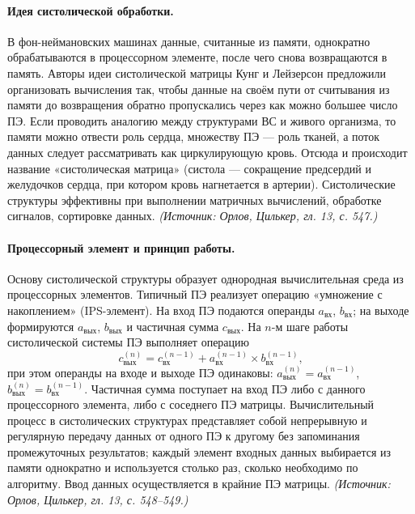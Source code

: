 \documentclass[a4paper,12pt]{article}
\begin{document}
\paragraph{Идея систолической обработки.}
В фон-неймановских машинах данные, считанные из памяти, однократно обрабатываются в процессорном элементе, после чего снова возвращаются в память. Авторы идеи систолической матрицы Кунг и Лейзерсон предложили организовать вычисления так, чтобы данные на своём пути от считывания из памяти до возвращения обратно пропускались через как можно большее число ПЭ. Если проводить аналогию между структурами ВС и живого организма, то памяти можно отвести роль сердца, множеству ПЭ — роль тканей, а поток данных следует рассматривать как циркулирующую кровь. Отсюда и происходит название «систолическая матрица» (систола — сокращение предсердий и желудочков сердца, при котором кровь нагнетается в артерии). Систолические структуры эффективны при выполнении матричных вычислений, обработке сигналов, сортировке данных.
\textit{(Источник: Орлов, Цилькер, гл. 13, с. 547.)}

\paragraph{Процессорный элемент и принцип работы.}
Основу систолической структуры образует однородная вычислительная среда из процессорных элементов. Типичный ПЭ реализует операцию «умножение с накоплением» (IPS-элемент). На вход ПЭ подаются операнды \(a_{вх}\), \(b_{вх}\); на выходе формируются \(a_{вых}\), \(b_{вых}\) и частичная сумма \(c_{вых}\). На \(n\)-м шаге работы систолической системы ПЭ выполняет операцию
\[
c^{(n)}_{вых}=c^{(n-1)}_{вх}+a^{(n-1)}_{вх}\times b^{(n-1)}_{вх},
\]
при этом операнды на входе и выходе ПЭ одинаковы: \(a^{(n)}_{вых}=a^{(n-1)}_{вх}\), \(b^{(n)}_{вых}=b^{(n-1)}_{вх}\). Частичная сумма поступает на вход ПЭ либо с данного процессорного элемента, либо с соседнего ПЭ матрицы. Вычислительный процесс в систолических структурах представляет собой непрерывную и регулярную передачу данных от одного ПЭ к другому без запоминания промежуточных результатов; каждый элемент входных данных выбирается из памяти однократно и используется столько раз, сколько необходимо по алгоритму. Ввод данных осуществляется в крайние ПЭ матрицы.
\textit{(Источник: Орлов, Цилькер, гл. 13, с. 548--549.)}
\end{document}
